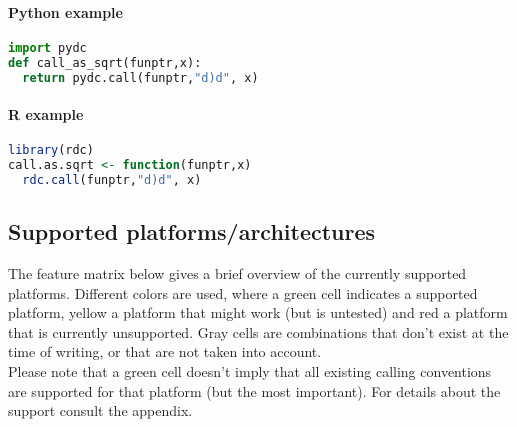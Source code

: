 \paragraph{Python example}

\begin{lstlisting}[language=python,caption=Dyncall Python bindings example]
import pydc
def call_as_sqrt(funptr,x):
  return pydc.call(funptr,"d)d", x)
\end{lstlisting}


\paragraph{R example}

\begin{lstlisting}[language=R,caption=Dyncall R bindings example]
library(rdc)
call.as.sqrt <- function(funptr,x)
  rdc.call(funptr,"d)d", x)
\end{lstlisting}


\pagebreak

\subsection{Supported platforms/architectures}

The feature matrix below gives a brief overview of the currently supported
platforms. Different colors are used, where a green cell indicates a supported
platform, yellow a platform that might work (but is untested) and red a platform
that is currently unsupported. Gray cells are combinations that don't exist
at the time of writing, or that are not taken into account.\\
Please note that a green cell doesn't imply that all existing calling
conventions are supported for that platform (but the most important). For
details about the support consult the appendix.

